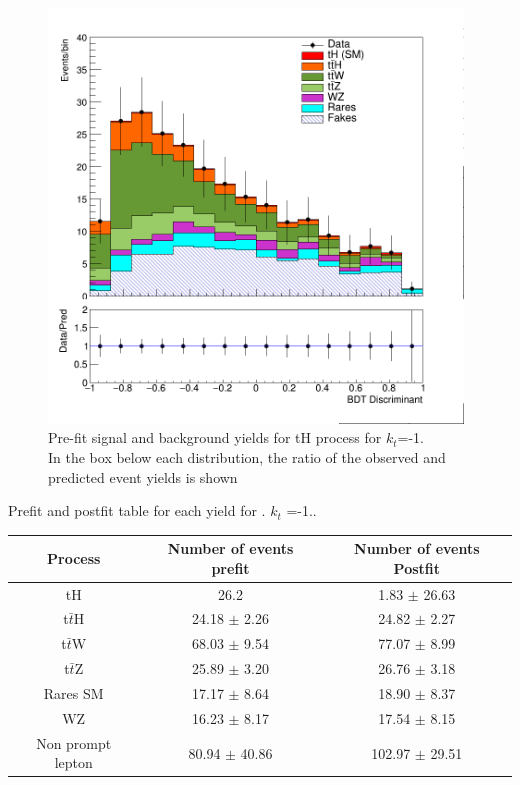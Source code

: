 \begin{figure}
	\centering
	\includegraphics[width=11cm,height=11cm]{Chapter4/kin.png}
	\caption{Pre-fit signal and background yields for tH process for $k_t$=-1.\\
		In the box below each distribution, the ratio of the observed and predicted event yields is shown}
\end{figure}

\begin{table}
	\centering
	Prefit and postfit table for each yield  for . $k_{t}$ =-1..
	\begin{tabular}{|c|c|c|}
		\hline
		Process  & Number of events prefit    & Number of events Postfit\\
		\hline
		tH & 26.2 & 1.83 $\pm$ 26.63\\
		\hline
		t$\bar{t}$H  & 24.18 $\pm$ 2.26& 24.82 $\pm$ 2.27\\
		\hline
		t$\bar{t}$W  & 68.03  $\pm$ 9.54 & 77.07 $\pm$ 8.99\\
		\hline
		t$\bar{t}$Z  & 25.89  $\pm$  3.20& 26.76 $\pm$ 3.18\\
		\hline
		Rares SM & 17.17  $\pm$ 8.64 & 18.90 $\pm$ 8.37\\
		\hline
		WZ & 16.23  $\pm$ 8.17& 17.54 $\pm$ 8.15\\
		\hline
		Non prompt lepton & 80.94   $\pm$ 40.86& 102.97 $\pm$ 29.51\\
		\hline
	\end{tabular}
\end{table}


